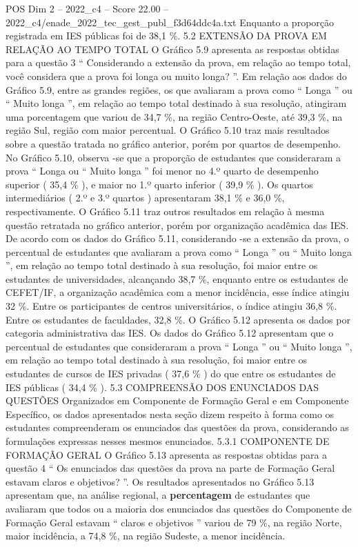 \begin{textsample}{POS Dim 2 – 2022\_c4 – Score 22.00 – 2022\_c4/enade\_2022\_tec\_gest\_publ\_f3d64ddc4a.txt}
Enquanto a proporção registrada em IES públicas foi de 38,1 \%. 5.2 EXTENSÃO DA PROVA EM RELAÇÃO AO TEMPO TOTAL O Gráfico 5.9 apresenta as respostas obtidas para a questão 3 “ Considerando a extensão da prova, em relação ao tempo total, você considera que a prova foi longa ou muito longa? ”.
Em relação aos dados do Gráfico 5.9, entre as grandes regiões, os que avaliaram a prova como “ Longa ” ou “ Muito longa ”, em relação ao tempo total destinado à sua resolução, atingiram uma porcentagem que variou de 34,7 \%, na região Centro-Oeste, até 39,3 \%, na região Sul, região com maior percentual.
O Gráfico 5.10 traz mais resultados sobre a questão tratada no gráfico anterior, porém por quartos de desempenho.
No Gráfico 5.10, observa -se que a proporção de estudantes que consideraram a prova “ Longa ou “ Muito longa ” foi menor no 4.º quarto de desempenho superior ( 35,4 \% ), e maior no 1.º quarto inferior ( 39,9 \% ).
Os quartos intermediários ( 2.º e 3.º quartos ) apresentaram 38,1 \% e 36,0 \%, respectivamente.
O Gráfico 5.11 traz outros resultados em relação à mesma questão retratada no gráfico anterior, porém por organização acadêmica das IES.
De acordo com os dados do Gráfico 5.11, considerando -se a extensão da prova, o percentual de estudantes que avaliaram a prova como “ Longa ” ou “ Muito longa ”, em relação ao tempo total destinado à sua resolução, foi maior entre os estudantes de universidades, alcançando 38,7 \%, enquanto entre os estudantes de CEFET/IF, a organização acadêmica com a menor incidência, esse índice atingiu 32 \%.
Entre os participantes de centros universitários, o índice atingiu 36,8 \%.
Entre os estudantes de faculdades, 32,8 \%.
O Gráfico 5.12 apresenta os dados por categoria administrativa das IES.
Os dados do Gráfico 5.12 apresentam que o percentual de estudantes que consideraram a prova “ Longa ” ou “ Muito longa ”, em relação ao tempo total destinado à sua resolução, foi maior entre os estudantes de cursos de IES privadas ( 37,6 \% ) do que entre os estudantes de IES públicas ( 34,4 \% ). 5.3 COMPREENSÃO DOS ENUNCIADOS DAS QUESTÕES Organizados em Componente de Formação Geral e em Componente Específico, os dados apresentados nesta seção dizem respeito à forma como os estudantes compreenderam os enunciados das questões da prova, considerando as formulações expressas nesses mesmos enunciados. 5.3.1 COMPONENTE DE FORMAÇÃO GERAL O Gráfico 5.13 apresenta as respostas obtidas para a questão 4 “ Os enunciados das questões da prova na parte de Formação Geral estavam claros e objetivos? ”.
Os resultados apresentados no Gráfico 5.13 apresentam que, na análise regional, a \textbf{percentagem} de estudantes que avaliaram que todos ou a maioria dos enunciados das questões do Componente de Formação Geral estavam “ claros e objetivos ” variou de 79 \%, na região Norte, maior incidência, a 74,8 \%, na região Sudeste, a menor incidência.

\end{textsample}
